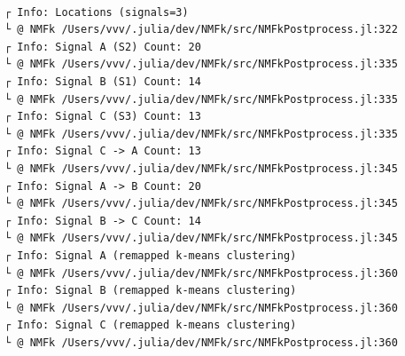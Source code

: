 \documentclass[11pt]{article}
\begin{document}
    
    \begin{center}
    \end{center}
    { \hspace*{\fill} \\}
    
    \begin{Verbatim}[commandchars=\\\{\}]
┌ Info: Locations (signals=3)
└ @ NMFk /Users/vvv/.julia/dev/NMFk/src/NMFkPostprocess.jl:322
┌ Info: Signal A (S2) Count: 20
└ @ NMFk /Users/vvv/.julia/dev/NMFk/src/NMFkPostprocess.jl:335
┌ Info: Signal B (S1) Count: 14
└ @ NMFk /Users/vvv/.julia/dev/NMFk/src/NMFkPostprocess.jl:335
┌ Info: Signal C (S3) Count: 13
└ @ NMFk /Users/vvv/.julia/dev/NMFk/src/NMFkPostprocess.jl:335
┌ Info: Signal C -> A Count: 13
└ @ NMFk /Users/vvv/.julia/dev/NMFk/src/NMFkPostprocess.jl:345
┌ Info: Signal A -> B Count: 20
└ @ NMFk /Users/vvv/.julia/dev/NMFk/src/NMFkPostprocess.jl:345
┌ Info: Signal B -> C Count: 14
└ @ NMFk /Users/vvv/.julia/dev/NMFk/src/NMFkPostprocess.jl:345
┌ Info: Signal A (remapped k-means clustering)
└ @ NMFk /Users/vvv/.julia/dev/NMFk/src/NMFkPostprocess.jl:360
┌ Info: Signal B (remapped k-means clustering)
└ @ NMFk /Users/vvv/.julia/dev/NMFk/src/NMFkPostprocess.jl:360
┌ Info: Signal C (remapped k-means clustering)
└ @ NMFk /Users/vvv/.julia/dev/NMFk/src/NMFkPostprocess.jl:360
    \end{Verbatim}

    \begin{center}
    \end{center}
    { \hspace*{\fill} \\}
    
    \begin{Verbatim}[commandchars=\\\{\}]

    \end{Verbatim}

    \begin{center}
    \end{center}
    { \hspace*{\fill} \\}
    
    \begin{center}
    \end{center}
    { \hspace*{\fill} \\}
    
\end{document}
